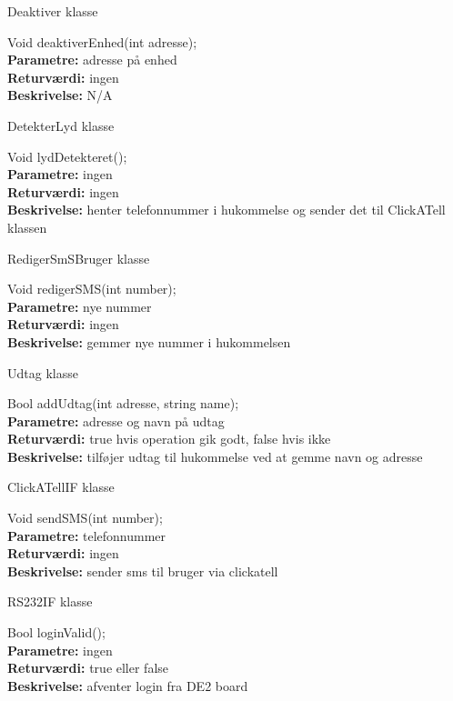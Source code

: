 {\centering 
Deaktiver klasse\par
}

Void deaktiverEnhed(int adresse); \\
\textbf{Parametre:} adresse på enhed \\
\textbf{Returværdi:} ingen \\
\textbf{Beskrivelse:} N/A \\

{\centering 
DetekterLyd klasse\par
}

Void lydDetekteret(); \\
\textbf{Parametre:} ingen \\
\textbf{Returværdi:} ingen \\
\textbf{Beskrivelse:} henter telefonnummer i hukommelse og sender det til ClickATell klassen \\

{\centering 
RedigerSmSBruger klasse\par
}

Void redigerSMS(int number); \\
\textbf{Parametre:} nye nummer \\
\textbf{Returværdi:} ingen \\
\textbf{Beskrivelse:} gemmer nye nummer i hukommelsen \\

{\centering 
Udtag klasse\par
}

Bool addUdtag(int adresse, string name); \\
\textbf{Parametre:} adresse og navn på udtag \\
\textbf{Returværdi:} true hvis operation gik godt, false hvis ikke \\
\textbf{Beskrivelse:} tilføjer udtag til hukommelse ved at gemme navn og adresse \\

{\centering 
ClickATellIF klasse\par
}

Void sendSMS(int number); \\
\textbf{Parametre:} telefonnummer \\
\textbf{Returværdi:} ingen \\
\textbf{Beskrivelse:} sender sms til bruger via clickatell \\

{\centering 
RS232IF klasse\par
}

Bool loginValid(); \\
\textbf{Parametre:} ingen \\
\textbf{Returværdi:} true eller false \\
\textbf{Beskrivelse:} afventer login fra DE2 board \\

